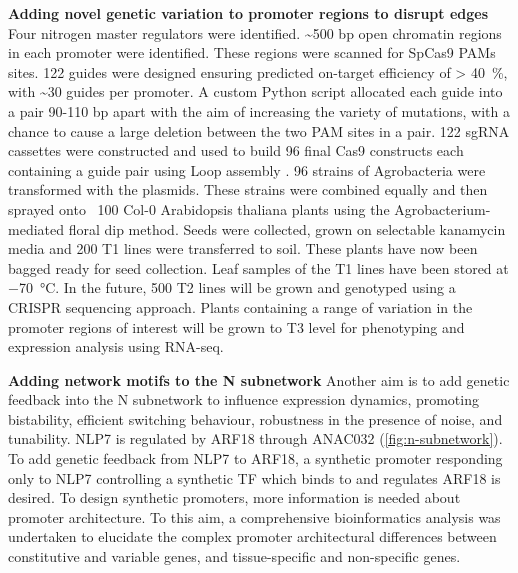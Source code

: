 \documentclass[../main.tex]{subfiles}
\begin{document}
\textbf{Adding novel genetic variation to promoter regions to disrupt edges}
Four nitrogen master regulators were identified. \textasciitilde{}500 bp open chromatin regions in each promoter were identified. These regions were scanned for SpCas9 PAMs sites. 122 guides were designed ensuring predicted on-target efficiency of \textgreater{} \SI{40}{\percent}, with \textasciitilde{}30 guides per promoter. A custom Python script allocated each guide into a pair 90-110 bp apart with the aim of increasing the variety of mutations, with a chance to cause a large deletion between the two PAM sites in a pair. 122 sgRNA cassettes were constructed and used to build 96 final Cas9 constructs each containing a guide pair using Loop assembly \autocite{pollakLoopAssemblySimple2018}. 96 strains of Agrobacteria were transformed with the plasmids. These strains were combined equally and then sprayed onto ~100 Col-0 Arabidopsis thaliana plants using the Agrobacterium-mediated floral dip method. Seeds were collected, grown on selectable kanamycin media and 200 T1 lines were transferred to soil. These plants have now been bagged ready for seed collection. Leaf samples of the T1 lines have been stored at \SI{-70}{\degreeCelsius}. In the future, 500 T2 lines will be grown and genotyped using a CRISPR sequencing approach. Plants containing a range of variation in the promoter regions of interest will be grown to T3 level for phenotyping and expression analysis using RNA-seq.

\textbf{Adding network motifs to the N subnetwork}
Another aim is to add genetic feedback into the N subnetwork to influence expression dynamics, promoting bistability, efficient switching behaviour, robustness in the presence of noise, and tunability. NLP7 is regulated by ARF18 through ANAC032 (\autoref{fig:n-subnetwork}). To add genetic feedback from NLP7 to ARF18, a synthetic promoter responding only to NLP7 controlling a synthetic TF which binds to and regulates ARF18 is desired. To design synthetic promoters, more information is needed about promoter architecture. To this aim, a comprehensive bioinformatics analysis was undertaken to elucidate the complex promoter architectural differences between constitutive and variable genes, and tissue-specific and non-specific genes.
\end{document}
